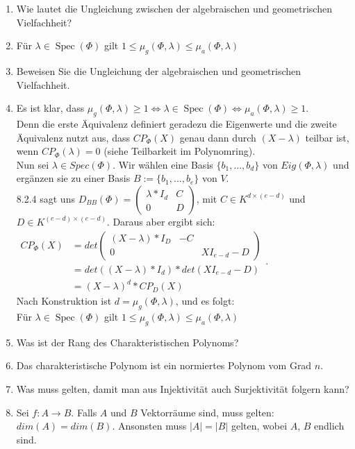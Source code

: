 \documentclass[11pt,parskip=full]{scrartcl}
\newcommand{\answer}{\item[\textbf{Antwort}]}
\begin{document}
\begin{enumerate}[label=\textbf{\arabic*. Frage}]
		\item Wie lautet die Ungleichung zwischen der algebraischen und geometrischen Vielfachheit?
		\answer Für \(\lambda \in \operatorname{Spec}(\Phi)\) gilt \(1 \leq \mu_{g}(\Phi, \lambda) \leq \mu_{a}(\Phi, \lambda)\)
		
		\item Beweisen Sie die Ungleichung der algebraischen und geometrischen Vielfachheit.
		\answer Es ist klar, dass \(\mu_{g}(\Phi, \lambda) \geq 1 \Longleftrightarrow \lambda \in \operatorname{Spec}(\Phi) \Longleftrightarrow \mu_{a}(\Phi, \lambda) \geq 1\).\\
		Denn die erste Äquivalenz definiert geradezu die Eigenwerte und die zweite Äquivalenz nutzt aus, dass \(CP_\Phi(X)\) genau dann durch $(X-\lambda)$ teilbar ist, wenn \(CP_\Phi(\lambda) = 0\) (siehe Teilbarkeit im Polynomring).\\
		Nun sei \(\lambda \in Spec(\Phi)\). Wir wählen eine Basis \(\{b_1,...,b_d\}\) von \(Eig(\Phi, \lambda)\) und ergänzen sie zu einer Basis \(B := \{b_1,...,b_e\}\) von $V$.\\
		8.2.4 sagt uns \(D_{BB}(\Phi) = \begin{pmatrix} \lambda * I_d & C \\ 0 & D \end{pmatrix}\), mit \(C \in K^{d \times (e-d)}\) und \(D \in K^{(e-d) \times (e-d)}\). Daraus aber ergibt sich:\\
		\(\begin{aligned}CP_\Phi(X) &= det \begin{pmatrix}
		(X-\lambda)*I_D & -C \\ 0 && XI_{e-d}-D
		\end{pmatrix} \\ &= det((X-\lambda)*I_d)*det(XI_{e-d}-D)\\ &= (X-\lambda)^d*CP_D(X) \end{aligned}\).\\
		Nach Konstruktion ist \(d = \mu_{g}(\Phi, \lambda)\), und es folgt: \\
		Für \(\lambda \in \operatorname{Spec}(\Phi)\) gilt \(1 \leq \mu_{g}(\Phi, \lambda) \leq \mu_{a}(\Phi, \lambda)\)
		
		\item Was ist der Rang des Charakteristischen Polynoms?
		\answer Das charakteristische Polynom ist ein normiertes Polynom vom Grad $n$.
		
		\item Was muss gelten, damit man aus Injektivität auch Surjektivität folgern kann?
		\answer Sei \(f: A \rightarrow B\). Falls $A$ und $B$ Vektorräume sind, muss gelten: \(dim(A) = dim(B)\). Ansonsten muss \(|A| = |B|\) gelten, wobei $A$, $B$ endlich sind.
			

\end{enumerate}
\end{document}

